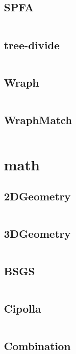\documentclass[a4]{article}
\begin{document}
\subsection{SPFA}
\inputminted[mathescape,linenos,numbersep=5pt,frame=lines,framesep=2mm]{cpp}{src/graph/SPFA.cpp}
\subsection{tree-divide}
\inputminted[mathescape,linenos,numbersep=5pt,frame=lines,framesep=2mm]{cpp}{src/graph/tree-divide.cpp}
\subsection{Wraph}
\inputminted[mathescape,linenos,numbersep=5pt,frame=lines,framesep=2mm]{cpp}{src/graph/Wraph.cpp}
\subsection{WraphMatch}
\inputminted[mathescape,linenos,numbersep=5pt,frame=lines,framesep=2mm]{cpp}{src/graph/WraphMatch.cpp}
\section{math}
\subsection{2DGeometry}
\inputminted[mathescape,linenos,numbersep=5pt,frame=lines,framesep=2mm]{cpp}{src/math/2DGeometry.cpp}
\subsection{3DGeometry}
\inputminted[mathescape,linenos,numbersep=5pt,frame=lines,framesep=2mm]{cpp}{src/math/3DGeometry.cpp}
\subsection{BSGS}
\inputminted[mathescape,linenos,numbersep=5pt,frame=lines,framesep=2mm]{cpp}{src/math/BSGS.cpp}
\subsection{Cipolla}
\inputminted[mathescape,linenos,numbersep=5pt,frame=lines,framesep=2mm]{cpp}{src/math/Cipolla.cpp}
\subsection{Combination}
\inputminted[mathescape,linenos,numbersep=5pt,frame=lines,framesep=2mm]{cpp}{src/math/Combination.cpp}
\end{document}
